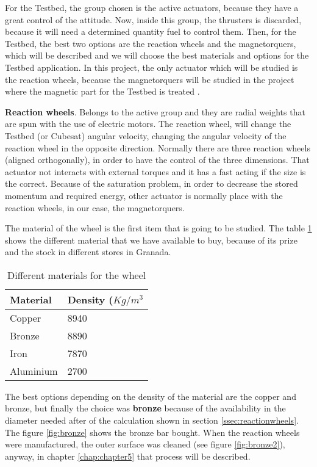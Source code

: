 For the Testbed, the group chosen is the active actuators, because they have a great control of the attitude. Now, inside this group, the thrusters is discarded, because it will need a determined quantity fuel to control them. Then, for the Testbed, the best two options are the reaction wheels and the magnetorquers, which will be described and we will choose the best materials and options for the Testbed application. In this project, the only actuator which will be studied is the reaction wheels, because the magnetorquers will be studied in the project where the magnetic part for the Testbed is treated \cite{alejandro}.

\textbf{Reaction wheels}. Belongs to the active group and they are radial weights that are spun with the use of electric motors. The reaction wheel, will change the Testbed (or Cubesat) angular velocity, changing the angular velocity of the reaction wheel in the opposite direction. Normally there are three reaction wheels (aligned orthogonally), in order to have the control of the three dimensions. That actuator not interacts with external torques and it has a fast acting if the size is the correct. Because of the saturation problem, in order to decrease the stored momentum and required energy, other actuator is normally place with the reaction wheels, in our case, the magnetorquers.

The material of the wheel is the first item that is going to be studied. The table \ref{tab:wheel} shows the different material that we have available to buy, because of its prize and the stock in different stores in Granada.

\begin{table}[H]
\centering
\begin{tabular}{|l|l|}
\hline\hline
\textbf{Material} & \textbf{Density ($Kg/m^3$} \\ \hline\hline
Copper            &8940   \\ \hline
Bronze             & 8890\\ \hline
Iron         & 7870\\ \hline
Aluminium         & 2700\\ \hline\hline
\end{tabular}
\caption{Different materials for the wheel} \label{tab:wheel}
\end{table}

The best options depending on the density of the material are the copper and bronze, but finally the choice was \textbf{bronze} because of the availability in the diameter needed after of the calculation shown in section \ref{ssec:reactionwheels}. The figure \ref{fig:bronze} shows the bronze bar bought. When the reaction wheels were manufactured, the outer surface was cleaned (see figure \ref{fig:bronze2}), anyway, in chapter \ref{chap:chapter5} that process will be described.

